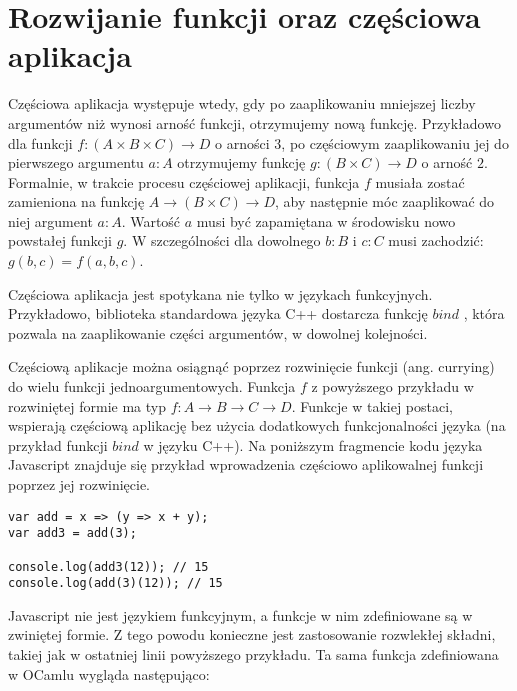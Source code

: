 \documentclass[declaration,shortabstract]{iithesis}
\begin{document}

\section{Rozwijanie funkcji oraz częściowa aplikacja}

Częściowa aplikacja występuje wtedy, gdy po zaaplikowaniu mniejszej liczby 
argumentów niż wynosi arność funkcji, otrzymujemy nową funkcję. Przykładowo 
dla funkcji $f: (A \times B \times C) \rightarrow D$ o arności $3$,
po częściowym zaaplikowaniu jej do pierwszego 
argumentu $a : A$ otrzymujemy funkcję $g : (B \times C) \rightarrow D$ o arność $2$.
Formalnie, w trakcie procesu częściowej aplikacji,
funkcja $f$ musiała zostać zamieniona na funkcję 
$A \rightarrow (B \times C) \rightarrow D$, aby następnie móc zaaplikować do niej 
argument $a : A$. Wartość $a$ musi być zapamiętana w środowisku nowo powstałej 
funkcji $g$.
W szczególności
dla dowolnego $b : B$ i $c : C$  musi zachodzić: $g(b, c) = f(a, b, c)$. 

Częściowa aplikacja jest spotykana nie tylko w językach funkcyjnych. 
Przykładowo, biblioteka standardowa języka C++ dostarcza funkcję
$bind$ \cite{cpp_bind}, która pozwala na zaaplikowanie części argumentów,
w dowolnej kolejności. 

Częściową aplikacje można osiągnąć poprzez rozwinięcie funkcji (ang. currying) 
do wielu funkcji jednoargumentowych. Funkcja $f$ z powyższego przykładu 
w rozwiniętej
formie ma typ $f : A \rightarrow B \rightarrow C \rightarrow D$. Funkcje w 
takiej postaci, wspierają częściową aplikację bez użycia dodatkowych 
funkcjonalności języka (na przykład funkcji $bind$ w języku C++).
Na poniższym fragmencie kodu języka Javascript
znajduje się przykład wprowadzenia częściowo aplikowalnej funkcji 
poprzez jej rozwinięcie.

\begin{lstlisting}[frame=lines]
var add = x => (y => x + y);
var add3 = add(3);

console.log(add3(12)); // 15
console.log(add(3)(12)); // 15
\end{lstlisting}

Javascript nie jest językiem funkcyjnym, a funkcje w nim zdefiniowane są w 
zwiniętej formie. Z tego powodu konieczne jest zastosowanie rozwlekłej składni,
takiej jak w ostatniej linii powyższego przykładu. Ta sama funkcja 
zdefiniowana w OCamlu wygląda następująco:
\end{document}
